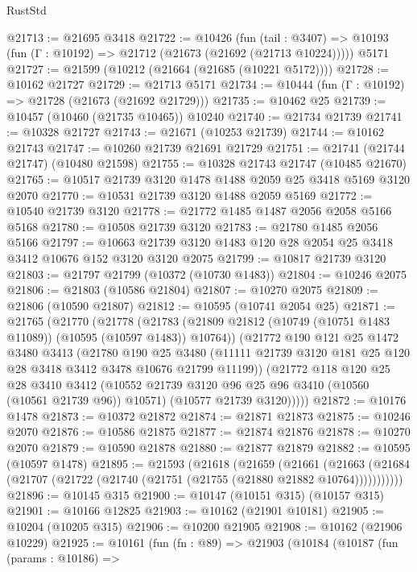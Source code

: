 \begin{lexlean}{RustStd}
\begin{coremodule}
@21713 := @21695 @3418
@21722 := @10426
    (fun (tail : @3407) => @10193 (fun (Γ : @10192) => @21712 (@21673 (@21692 (@21713 @10224)))))
    @5171
@21727 := @21599 (@10212 (@21664 (@21685 (@10221 @5172))))
@21728 := @10162 @21727
@21729 := @21713 @5171
@21734 := @10444 (fun (Γ : @10192) => @21728 (@21673 (@21692 @21729)))
@21735 := @10462 @25
@21739 := @10457 (@10460 (@21735 @10465)) @10240
@21740 := @21734 @21739
@21741 := @10328 @21727
@21743 := @21671 (@10253 @21739)
@21744 := @10162 @21743
@21747 := @10260 @21739 @21691 @21729
@21751 := @21741 (@21744 @21747) (@10480 @21598)
@21755 := @10328 @21743 @21747 (@10485 @21670)
@21765 := @10517 @21739 @3120 @1478 @1488 @2059 @25 @3418 @5169 @3120 @2070
@21770 := @10531 @21739 @3120 @1488 @2059 @5169
@21772 := @10540 @21739 @3120
@21778 := @21772 @1485 @1487 @2056 @2058 @5166 @5168
@21780 := @10508 @21739 @3120
@21783 := @21780 @1485 @2056 @5166
@21797 := @10663 @21739 @3120 @1483 @120 @28 @2054 @25 @3418 @3412 @10676 @152 @3120 @3120 @2075
@21799 := @10817 @21739 @3120
@21803 := @21797 @21799 (@10372 (@10730 @1483))
@21804 := @10246 @2075
@21806 := @21803 (@10586 @21804)
@21807 := @10270 @2075
@21809 := @21806 (@10590 @21807)
@21812 := @10595 (@10741 @2054 @25)
@21871 := @21765
    (@21770
      (@21778
        (@21783 (@21809 @21812 (@10749 (@10751 @1483 @11089)) (@10595 (@10597 @1483)) @10764))
        (@21772
          @190
          @121
          @25
          @1472
          @3480
          @3413
          (@21780
            @190
            @25
            @3480
            (@11111 @21739 @3120 @181 @25 @120 @28 @3418 @3412 @3478 @10676 @21799 @11199))
          (@21772
            @118
            @120
            @25
            @28
            @3410
            @3412
            (@10552 @21739 @3120 @96 @25 @96 @3410 (@10560 (@10561 @21739 @96)) @10571)
            (@10577 @21739 @3120)))))
@21872 := @10176 @1478
@21873 := @10372 @21872
@21874 := @21871 @21873
@21875 := @10246 @2070
@21876 := @10586 @21875
@21877 := @21874 @21876
@21878 := @10270 @2070
@21879 := @10590 @21878
@21880 := @21877 @21879
@21882 := @10595 (@10597 @1478)
@21895 := @21593
    (@21618
      (@21659
        (@21661
          (@21663 (@21684 (@21707 (@21722 (@21740 (@21751 (@21755 (@21880 @21882 @10764)))))))))))
@21896 := @10145 @315
@21900 := @10147 (@10151 @315) (@10157 @315)
@21901 := @10166 @12825
@21903 := @10162 (@21901 @10181)
@21905 := @10204 (@10205 @315)
@21906 := @10200 @21905
@21908 := @10162 (@21906 @10229)
@21925 := @10161
    (fun (fn : @89) =>
    @21903
      (@10184
        (@10187
          (fun (params : @10186) =>

\end{coremodule}
\end{lexlean}
